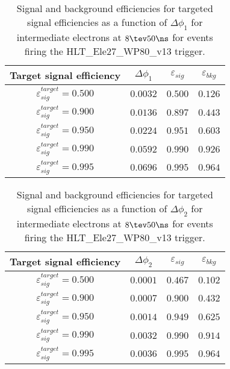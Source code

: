 \clearpage

\begin{table}[!bht]
  \begin{center}
    \begin{tabular}{cccc}
      \hline
      Target signal efficiency & $\Delta\phi_1$ & $\varepsilon_{sig}$ & $\varepsilon_{bkg}$ \\ 
      \hline
      $\varepsilon_{sig}^{target} = 0.500$ & $  0.0032$ & $0.500$ & $0.126$ \\
      $\varepsilon_{sig}^{target} = 0.900$ & $  0.0136$ & $0.897$ & $0.443$ \\
      $\varepsilon_{sig}^{target} = 0.950$ & $  0.0224$ & $0.951$ & $0.603$ \\
      $\varepsilon_{sig}^{target} = 0.990$ & $  0.0592$ & $0.990$ & $0.926$ \\
      $\varepsilon_{sig}^{target} = 0.995$ & $  0.0696$ & $0.995$ & $0.964$ \\
      \hline
    \end{tabular}
    \caption{Signal and background efficiencies for targeted signal efficiencies as a function of $\Delta\phi_1$ for intermediate electrons at $8\tev 50\ns$ for events firing the HLT\_Ele27\_WP80\_v13 trigger.}
    \label{tab:eff_rej_phi1_beam_8_50_trigger_27_I}
  \end{center}
\end{table}

\clearpage

\begin{table}[!bht]
  \begin{center}
    \begin{tabular}{cccc}
      \hline
      Target signal efficiency & $\Delta\phi_2$ & $\varepsilon_{sig}$ & $\varepsilon_{bkg}$ \\ 
      \hline
      $\varepsilon_{sig}^{target} = 0.500$ & $  0.0001$ & $0.467$ & $0.102$ \\
      $\varepsilon_{sig}^{target} = 0.900$ & $  0.0007$ & $0.900$ & $0.432$ \\
      $\varepsilon_{sig}^{target} = 0.950$ & $  0.0014$ & $0.949$ & $0.625$ \\
      $\varepsilon_{sig}^{target} = 0.990$ & $  0.0032$ & $0.990$ & $0.914$ \\
      $\varepsilon_{sig}^{target} = 0.995$ & $  0.0036$ & $0.995$ & $0.964$ \\
      \hline
    \end{tabular}
    \caption{Signal and background efficiencies for targeted signal efficiencies as a function of $\Delta\phi_2$ for intermediate electrons at $8\tev 50\ns$ for events firing the HLT\_Ele27\_WP80\_v13 trigger.}
    \label{tab:eff_rej_phi2_beam_8_50_trigger_27_I}
  \end{center}
\end{table}


